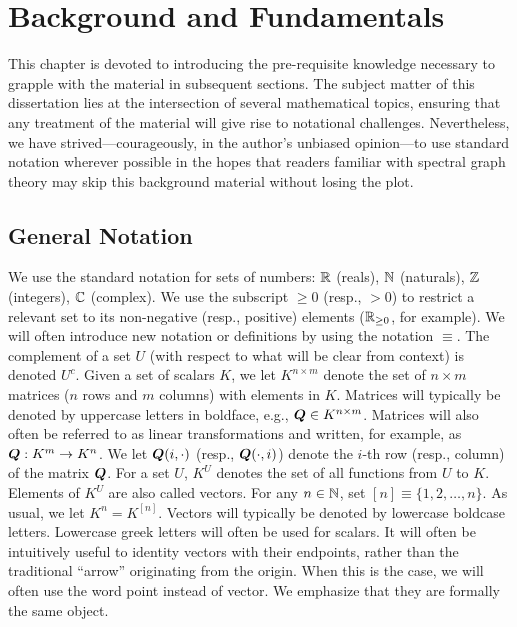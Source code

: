 \chapter{Background and Fundamentals}
\label{chap:background}
This chapter is devoted to introducing the  pre-requisite knowledge necessary to grapple with the material in subsequent sections. The subject matter of this dissertation lies at the intersection of several mathematical topics, ensuring that any treatment  of the material will give rise to notational challenges. Nevertheless, we have strived---courageously, in the author's unbiased opinion---to use standard notation wherever possible in the hopes that readers familiar with spectral graph theory may skip this background material without losing the plot. 


\section{General Notation}
\label{sec:background_general}
We use the standard notation for sets of numbers: $\mathbb{R}$ (reals), $\mathbb{N}$ (naturals), $\mathbb{Z}$ (integers), $\mathbb{C}$ (complex).  We use the subscript $\geq 0$ (resp., $>0$) to restrict a relevant set to its non-negative (resp., positive) elements ($\mathbb{R}_{\geq 0}$, for example). 
We will often introduce new notation or definitions by using the notation $\equiv$. The complement of a set $U$ (with respect to what will be clear from context) is denoted $U^c$. 
Given a set of scalars $K$, we let $K^{n\times m}$ denote the set of $n\times m$ matrices ($n$ rows and $m$ columns) with elements in $K$. Matrices will typically be denoted by uppercase letters in boldface, e.g., $\vb*{Q}\in K^{n\times m}$. Matrices will also often be referred to as linear transformations and written, for example, as $\vb*{Q}:K^m \to K^n$. 
We let $\vb*{Q}(i,\cdot)$ (resp., $\vb*{Q}(\cdot,i)$) denote the $i$-th row (resp., column) of the matrix $\vb*{Q}$. 
For a set $U$, $K^U$ denotes the set of all functions from $U$ to $K$.  Elements of $K^U$ are also called vectors. For any $n\in\mathbb{N}$, set $[n]\equiv \{1,2,\dots,n\}$. As usual, we let $K^n=K^{[n]}$. Vectors will typically be denoted by lowercase boldcase letters. Lowercase  greek letters will often be used for scalars. It will often  be intuitively useful to identity vectors with their endpoints, rather than the traditional ``arrow'' originating from the origin. When this is the case, we will often use the word point instead of vector. We emphasize that they are formally the same object. 

